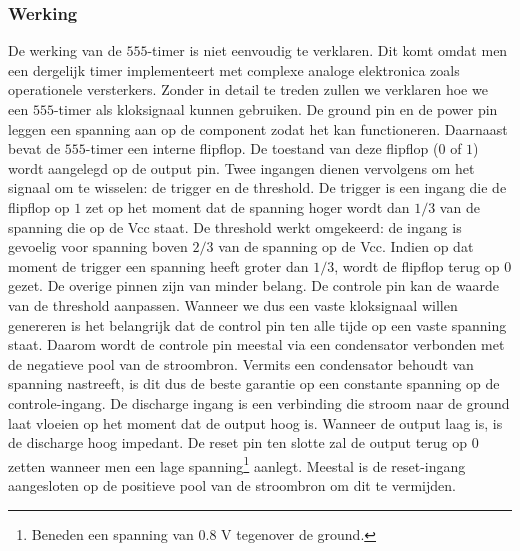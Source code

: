 \subsubsection{Werking}
De werking van de $555$-timer is niet eenvoudig te verklaren. Dit komt omdat men een dergelijk timer implementeert met complexe analoge elektronica zoals operationele versterkers. Zonder in detail te treden zullen we verklaren hoe we een $555$-timer als kloksignaal kunnen gebruiken. De ground pin en de power pin leggen een spanning aan op de component zodat het kan functioneren. Daarnaast bevat de $555$-timer een interne flipflop. De toestand van deze flipflop ($0$ of $1$) wordt aangelegd op de output pin. Twee ingangen dienen vervolgens om het signaal om te wisselen: de \mbox{trigger} en de \mbox{threshold}. De \mbox{trigger} is een ingang die de flipflop op $1$ zet op het moment dat de spanning hoger wordt dan $1/3$  van de spanning die op de \mbox{Vcc} staat. De \mbox{threshold} werkt omgekeerd: de ingang is gevoelig voor spanning boven $2/3$ van de spanning op de \mbox{Vcc}. Indien op dat moment de trigger een spanning heeft groter dan $1/3$, wordt de flipflop terug op $0$ gezet. De overige pinnen zijn van minder belang. De controle pin kan de waarde van de threshold aanpassen. Wanneer we dus een vaste kloksignaal willen genereren is het belangrijk dat de control pin ten alle tijde op een vaste spanning staat. Daarom wordt de controle pin meestal via een condensator verbonden met de negatieve pool van de stroombron. Vermits een condensator behoudt van spanning nastreeft, is dit dus de beste garantie op een constante spanning op de controle-ingang. De \mbox{discharge} ingang is een verbinding die stroom naar de ground laat vloeien op het moment dat de \mbox{output} hoog is. Wanneer de \mbox{output} laag is, is de \mbox{discharge} hoog impedant. De \mbox{reset} pin ten slotte zal de output terug op $0$ zetten wanneer men een lage spanning\footnote{Beneden een spanning van $0.8\mbox{ V}$ tegenover de ground.} aanlegt. Meestal is de \mbox{reset}-ingang aangesloten op de positieve pool van de stroombron om dit te vermijden.
